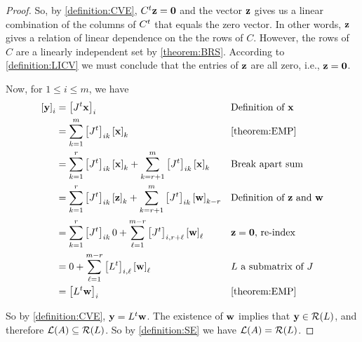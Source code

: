 \documentclass{ximera}
\begin{document}
\begin{theorem}
\begin{proof}
  So, by \ref{definition:CVE}, $C^{t}\mathbf{z}=\mathbf{0}$ and
  the vector $\mathbf{z}$ gives us a linear combination of the columns
  of $C^{t}$ that equals the zero vector.  In other words,
  $\mathbf{z}$ gives a relation of linear dependence on the the rows of
  $C$.  However, the rows of $C$ are a linearly independent set by
  \ref{theorem:BRS}.  According to \ref{definition:LICV} we must
  conclude that the entries of $\mathbf{z}$ are all zero, i.e.,
  $\mathbf{z}=\mathbf{0}$.

  Now, for $1\leq i\leq m$, we have
  \begin{align*}
    \left\lbrack\mathbf{y}\right\rbrack_{i}
    &=\left\lbrack J^{t}\mathbf{x}\right\rbrack_{i}
    &&\text{Definition of $\mathbf{x}$}\\
    &=\sum_{k=1}^{m}\left\lbrack J^{t}\right\rbrack_{ik}\left\lbrack\mathbf{x}\right\rbrack_{k}
    &&\ref{theorem:EMP}\\
    &=\sum_{k=1}^{r}\left\lbrack J^{t}\right\rbrack_{ik}\left\lbrack\mathbf{x}\right\rbrack_{k}+
      \sum_{k=r+1}^{m}\left\lbrack J^{t}\right\rbrack_{ik}\left\lbrack\mathbf{x}\right\rbrack_{k}
    &&\text{Break apart sum}\\
    &=\sum_{k=1}^{r}\left\lbrack J^{t}\right\rbrack_{ik}\left\lbrack\mathbf{z}\right\rbrack_{k}+
      \sum_{k=r+1}^{m}\left\lbrack J^{t}\right\rbrack_{ik}\left\lbrack\mathbf{w}\right\rbrack_{k-r}
    &&\text{Definition of $\mathbf{z}$ and $\mathbf{w}$}\\
    &=\sum_{k=1}^{r}\left\lbrack J^{t}\right\rbrack_{ik}0+
      \sum_{\ell=1}^{m-r}\left\lbrack J^{t}\right\rbrack_{i,r+\ell}\left\lbrack\mathbf{w}\right\rbrack_{\ell}
    &&\text{$\mathbf{z}=\mathbf{0}$, re-index}\\
    &=0+\sum_{\ell=1}^{m-r}\left\lbrack L^{t}\right\rbrack_{i,\ell}\left\lbrack\mathbf{w}\right\rbrack_{\ell}
    &&\text{$L$ a submatrix of $J$}\\
    &=\left\lbrack L^{t}\mathbf{w}\right\rbrack_{i}
    &&\ref{theorem:EMP}\\
  \end{align*}

  So by \ref{definition:CVE}, $\mathbf{y}=L^{t}\mathbf{w}$.  The
  existence of $\mathbf{w}$ implies that $\mathbf{y}\in\mathcal{R}\!\left(L\right)$, and
  therefore $\mathcal{L}\!\left(A\right)\subseteq\mathcal{R}\!\left(L\right)$.  So by \ref{definition:SE} we
  have $\mathcal{L}\!\left(A\right)=\mathcal{R}\!\left(L\right)$.

\end{proof}
\end{theorem}
\end{document}
